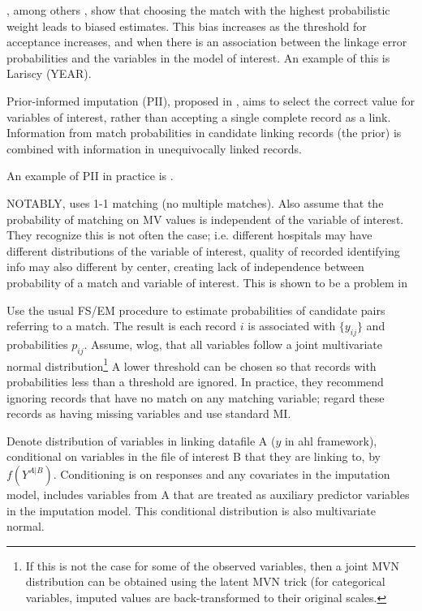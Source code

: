 \documentclass[12pt]{article}
\begin{document}
\cite{Goldstein2012}, among others \citep{hirukawa2018}, show that choosing the match with the highest probabilistic weight leads to biased estimates.  This bias increases as the threshold for acceptance increases, and when there is an association between the linkage error probabilities and the variables in the model of interest.   An example of this is Lariscy (YEAR). 

Prior-informed imputation (PII), proposed in \cite{Goldstein2012}, aims to select the
correct value for variables of interest, rather than accepting a single complete record as a link.  Information from match probabilities in candidate linking records (the prior) is combined with information
in unequivocally linked records.  

An example of PII in practice is \cite{harron et al}.

NOTABLY, uses 1-1 matching (no multiple matches).  Also assume that the probability of matching on MV values is independent of the variable of interest.  They recognize this is not often the case; i.e. different hospitals may have different distributions of the variable of interest, quality of recorded identifying info may also different by center, creating lack of independence between probability of a match and variable of interest.  This is shown to be a problem in \cite{11 in paper} 

Use the usual FS/EM procedure to estimate probabilities of candidate pairs referring to a match.  The result is each record $i$ is associated with $\{y_{ij}\}$ and probabilities $p_{ij}$.  Assume, wlog, that all variables follow a joint multivariate normal distribution\footnote{If this is not the case for some of the observed variables, then a joint MVN distribution can be obtained using the latent MVN trick (for categorical variables, imputed values are back-transformed to their original scales.} A lower threshold can be chosen so that records with probabilities less than a threshold are ignored.  In practice, they recommend ignoring records that have no match on any matching variable; regard these records as having missing variables and use standard MI.

Denote distribution of variables in linking datafile A ($y$ in ahl framework), conditional on variables in the file of interest B that they are linking to, by $f(Y^{A|B})$.   Conditioning is on responses and any covariates in the imputation model, includes variables from A that are treated as auxiliary predictor variables in the imputation model.  This conditional distribution is also multivariate normal.  
\end{document}
